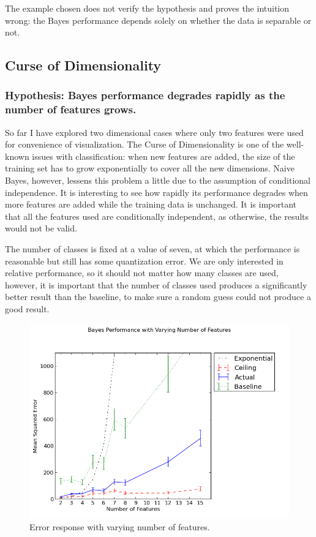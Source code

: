 \documentclass[12pt,notitlepage,twoside]{scrreprt}
\begin{document}
The example chosen does not verify the hypothesis and proves the intuition wrong: the
Bayes performance depends solely on whether the data is separable or not.

\subsection{Curse of Dimensionality}
\subsubsection*{Hypothesis: Bayes performance degrades rapidly as the number of features grows.}
So far I have explored two dimensional cases where only two features were used for
convenience of visualization. The Curse of Dimensionality is one of the well-known issues with
classification: when new features are added, the size of the training set has to grow
exponentially to cover all the new dimensions. Naive Bayes, however, lessens this problem
a little due to the assumption of conditional independence. It is interesting to see how
rapidly its performance degrades when more features are added while the training data is
unchanged. It is important that all the features used are conditionally independent, as
otherwise, the results would not be valid. 

The number of classes is fixed at a value of seven, at which the performance is
reasonable but still has some quantization error. We are only interested in
relative performance, so it should not matter how many classes are used,
however, it is important that the number of classes used produces a
significantly better result than the baseline, to make sure a random guess
could not produce a good result.

\begin{figure}[h!]
  \centering
  \includegraphics[width=\linewidth]{figs/feats.png}
  \caption{Error response with varying number of features.\label{feats}}
\end{figure}
\end{document}
